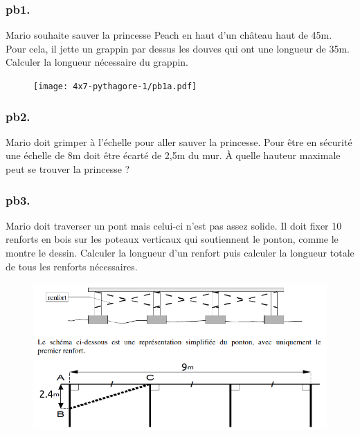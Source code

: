 \vspace{1cm} 

\subsubsection*{pb1.}

\begin{minipage}[t]{0.65\textwidth}
  Mario souhaite sauver la princesse Peach en haut d'un château haut de 45m. Pour cela, il jette un grappin par dessus les douves qui ont une longueur de 35m. Calculer la longueur nécessaire du grappin.

\vspace{1cm}
  
\end{minipage}
  \begin{minipage}[t]{0.35\textwidth}
  \begin{figure}[H]
    \centering
    \texttt{[image: 4x7-pythagore-1/pb1a.pdf]}
  \end{figure}
\end{minipage}


\subsubsection*{pb2.} 

Mario doit grimper à l'échelle pour aller sauver la princesse. Pour être en sécurité une échelle de 8m doit être écarté de 2,5m du mur. À quelle hauteur maximale peut se trouver la princesse ? \\

\vspace{1cm}

\subsubsection*{pb3.}  

Mario doit traverser un pont mais celui-ci n'est pas assez solide. Il doit fixer 10 renforts en bois sur les poteaux verticaux qui soutiennent le ponton, comme le montre le dessin. Calculer la longueur d'un renfort puis calculer la longueur totale de tous les renforts nécessaires. 
  
\begin{figure}[H]
  \centering
  \includegraphics[width=0.6\linewidth]{4x7-pythagore-1/pb4a.png}
\end{figure}


